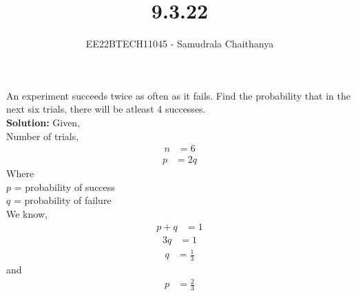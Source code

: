 \documentclass[journal,12pt,onecolumn]{article}
\theoremstyle{remark}
\newcommand{\solution}{\noindent \textbf{Solution: }}
\begin{document}
\title{9.3.22}
\date{}
\author{EE22BTECH11045 - Samudrala Chaithanya}
\maketitle
An experiment succeeds twice as often as it fails. Find the probability that in the next six trials, there will be atleast 4 successes. \\
\solution
Given, \\Number of trials,
\begin{align}
n &= 6
\end{align}
\begin{align}
p &= 2q
\end{align}
Where\\
$p$ = probability of success\\
$q$ = probability of failure\\
We know, 
\begin{align}
p + q &= 1
\end{align}
\begin{align}
 3q &= 1
\end{align}
\begin{align}
q &= \frac{1}{3}
\end{align}
and
\begin{align}
p &= \frac{2}{3}
\end{align}
\end{document}
